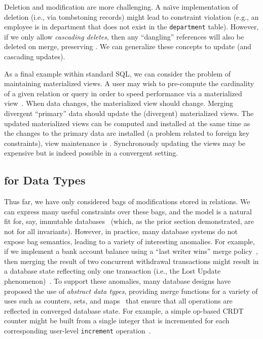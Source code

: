 Deletion and modification are more challenging. A na\"{\i}ve
implementation of deletion (i.e., via tombstoning records) might lead
to constraint violation (e.g., an employee is in department that does
not exist in the \texttt{department} table). However, if we only allow
\textit{cascading deletes}, then any ``dangling'' references will also
be deleted on merge, preserving \iconfluence. We can generalize these
concepts to update (and cascading updates).

 As a final example within standard SQL,
we can consider the problem of maintaining materialized views. A user
may wish to pre-compute the cardinality of a given relation or query
in order to speed performance via a materialized
view~\cite{gray-book}. When data changes, the materialized view should
change. Merging divergent ``primary'' data should update the
(divergent) materialized views. The updated materialized views can be
computed and installed at the same time as the changes to the primary
data are installed (a problem related to foreign key constraints),
view maintenance is \iconfluent. Synchronously updating the views may
be expensive but is indeed possible in a convergent setting.

\subsection{\iconfluence for Data Types}

Thus far, we have only considered bags of modifications stored in
relations. We can express many useful constraints over these bags, and
the model is a natural fit for, say, immutable
databases~\cite{gray-virtues,gray-book} (which, as the prior section
demonstrated, are not \iconfluent for all invariants). However, in
practice, many database systems do not expose bag semantics, leading
to a variety of interesting anomalies. For example, if we implement a
bank account balance using a ``last writer wins'' merge
policy~\cite{vogels-defs}, then merging the result of two concurrent
withdrawal transactions might result in a database state reflecting
only one transaction (i.e., the Lost Update
phenomenon)~\cite{adya-isolation,hat-vldb}. To support these
anomalies, many database designs have proposed the use of
\textit{abstract data types}, providing merge functions for a variety
of uses such as counters, sets, and
maps~\cite{crdt,atomictransactions,weihl-thesis,blooml} that ensure
that all operations are reflected in converged database state. For
example, a simple op-based CRDT counter might be built from a single
integer that is incremented for each corresponding user-level
\texttt{increment} operation~\cite{crdt}.

